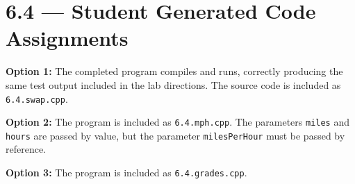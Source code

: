 \documentclass[11pt]{article}
\begin{document}
\section*{6.4 --- Student Generated Code Assignments}

	\textbf{Option 1:} The completed program compiles and runs, correctly producing the same test output included in the lab directions. The source code is included as \texttt{6.4.swap.cpp}.
	
	\textbf{Option 2:} The program is included as \texttt{6.4.mph.cpp}. The parameters \lstinline{miles} and \lstinline{hours} are passed by value, but the parameter \lstinline{milesPerHour} must be passed by reference.
	
	\textbf{Option 3:} The program is included as \texttt{6.4.grades.cpp}.
\end{document}
